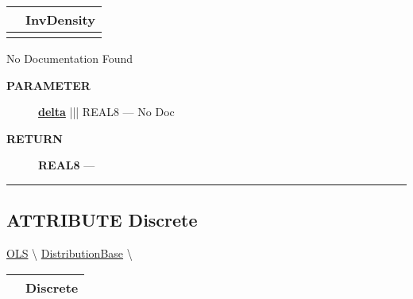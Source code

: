 {\renewcommand{\arraystretch}{1.5}
\begin{tabularx}{\textwidth}{|>{\raggedright\arraybackslash}l|X|}
\hline
\hspace{0pt}\mytexttt{\color{red} } & \textbf{InvDensity} \\
\hline
\multicolumn{2}{|>{\raggedright\arraybackslash}X|}{\hspace{0pt}\mytexttt{\color{param} (t\_FieldReal delta)}} \\
\hline
\end{tabularx}
}

\par





No Documentation Found






\par
\begin{description}
\item [\colorbox{tagtype}{\color{white} \textbf{\textsf{PARAMETER}}}] \textbf{\underline{delta}} ||| REAL8 --- No Doc
\end{description}







\par
\begin{description}
\item [\colorbox{tagtype}{\color{white} \textbf{\textsf{RETURN}}}] \textbf{REAL8} --- 
\end{description}




\rule{\linewidth}{0.5pt}
\subsection*{\textsf{\colorbox{headtoc}{\color{white} ATTRIBUTE}
Discrete}}

\hypertarget{ecldoc:linearregression.ols.distributionbase.discrete}{}
\hspace{0pt} \hyperlink{ecldoc:linearregression.ols}{OLS} \textbackslash 
\hspace{0pt} \hyperlink{ecldoc:linearregression.ols.distributionbase}{DistributionBase} \textbackslash 

{\renewcommand{\arraystretch}{1.5}
\begin{tabularx}{\textwidth}{|>{\raggedright\arraybackslash}l|X|}
\hline
\hspace{0pt}\mytexttt{\color{red} } & \textbf{Discrete} \\
\hline
\end{tabularx}
}

